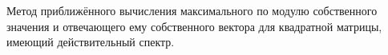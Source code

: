 \documentclass[__main__.tex]{subfiles}
\begin{document}
Метод приближённого вычисления максимального по модулю собственного значения и отвечающего ему собственного вектора для квадратной матрицы, имеющий действительный спектр.
\end{document}
